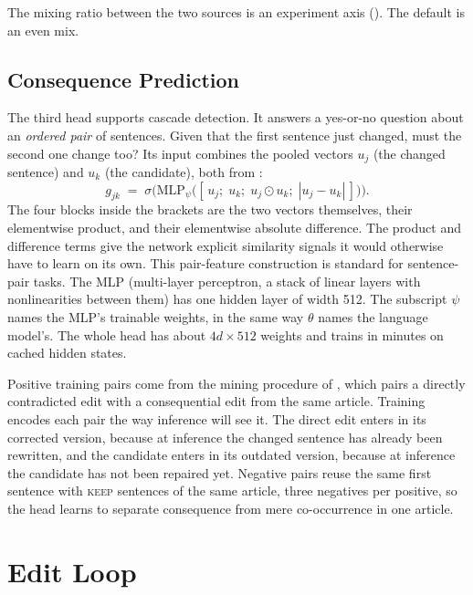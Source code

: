 \documentclass[]{paper}
\newcommand{\keep}{\textsc{keep}}
\begin{document}
The mixing ratio between the two sources is an experiment axis (). The default is an even mix.

\subsection{Consequence Prediction}
\label{sec:conshead}

The third head supports cascade detection. It answers a yes-or-no question about an \emph{ordered pair} of sentences. Given that the first sentence just changed, must the second one change too? Its input combines the pooled vectors $u_j$ (the changed sentence) and $u_k$ (the candidate), both from :
\begin{equation}
g_{jk} \;=\; \sigma\!\Big(\mathrm{MLP}_\psi\big([\,u_j;\; u_k;\; u_j \odot u_k;\; |u_j - u_k|\,]\big)\Big).
\label{eq:cons}
\end{equation}
The four blocks inside the brackets are the two vectors themselves, their elementwise product, and their elementwise absolute difference. The product and difference terms give the network explicit similarity signals it would otherwise have to learn on its own. This pair-feature construction is standard for sentence-pair tasks. The MLP (multi-layer perceptron, a stack of linear layers with nonlinearities between them) has one hidden layer of width 512. The subscript $\psi$ names the MLP's trainable weights, in the same way $\theta$ names the language model's. The whole head has about $4d \times 512$ weights and trains in minutes on cached hidden states.

Positive training pairs come from the mining procedure of , which pairs a directly contradicted edit with a consequential edit from the same article. Training encodes each pair the way inference will see it. The direct edit enters in its corrected version, because at inference the changed sentence has already been rewritten, and the candidate enters in its outdated version, because at inference the candidate has not been repaired yet. Negative pairs reuse the same first sentence with \keep{} sentences of the same article, three negatives per positive, so the head learns to separate consequence from mere co-occurrence in one article.

\section{Edit Loop}
\label{sec:inference}
\end{document}
